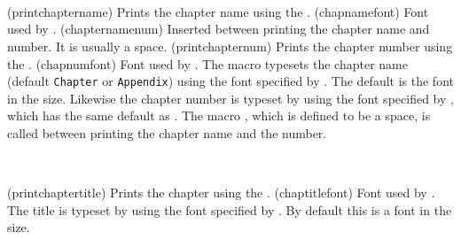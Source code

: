 \begin{syntax}
\cmd{\printchaptername} \cmd{\chapnamefont} \\
\cmd{\chapternamenum} \\
\cmd{\printchapternum} \cmd{\chapnumfont} \\
\end{syntax}
\glossary(printchaptername)%
  {}%
  {Prints the chapter name using the .}
\glossary(chapnamefont)%
  {}%
  {Font used by .}
\glossary(chapternamenum)%
  {}%
  {Inserted between printing the chapter name and number.
   It is usually a space.}
\glossary(printchapternum)%
  {}%
  {Prints the chapter number using the .}
\glossary(chapnumfont)%
  {}%
  {Font used by .}
The macro \cmd{\printchaptername} typesets the chapter name
(default \texttt{Chapter} or \texttt{Appendix}) using the font
specified by \cmd{\chapnamefont}. The default is the \cmd{\bfseries} font in
the \cmd{\huge} size. Likewise the chapter number is typeset by
\cmd{\printchapternum} using the font specified by \cmd{\chapnumfont},
which has the same default as \cmd{\chapnamefont}. The macro
\cmd{\chapternamenum}, which is defined to be a space, is called between
printing the chapter name and the number.

\begin{syntax}
\cmd{\printchaptertitle} \cmd{\chaptitlefont} \\
\end{syntax}
\glossary(printchaptertitle)%
  {}%
  {Prints the chapter  using the .}
\glossary(chaptitlefont)%
  {}%
  {Font used by .}
The title is typeset by \cmd{\printchaptertitle} using the font specified
by \cmd{\chaptitlefont}.
By default this is a \cmd{\bfseries} font in the \cmd{\Huge} size.

